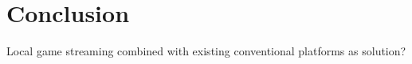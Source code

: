 \section{Conclusion}
\label{sec:conclusion}

Local game streaming combined with existing conventional platforms as solution?